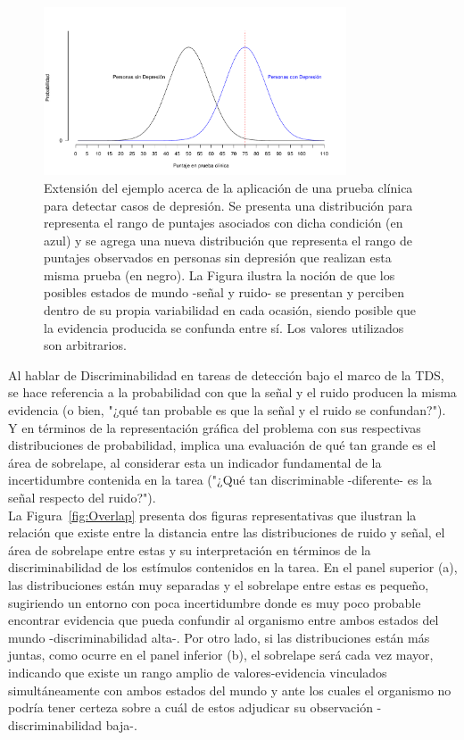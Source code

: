 \begin{figure}[th]
\centering
\includegraphics[width=0.80\textwidth]{Figures/Noise} 
\caption[Variabilidad en la señal y en el ruido]{Extensión del ejemplo acerca de la aplicación de una prueba clínica para detectar casos de depresión. Se presenta una distribución para representa el rango de puntajes asociados con dicha condición (en azul) y se agrega una nueva distribución que representa el rango de puntajes observados en personas sin depresión que realizan esta misma prueba (en negro). La Figura ilustra la noción de que los posibles estados de mundo -señal y ruido- se presentan y perciben dentro de su propia variabilidad en cada ocasión, siendo posible que la evidencia producida se confunda entre sí. Los valores utilizados son arbitrarios.}
\label{fig:Noise}
\end{figure}

Al hablar de Discriminabilidad en tareas de detección bajo el marco de la TDS, se hace referencia a la probabilidad con que la señal y el ruido producen la misma evidencia (o bien, "¿qué tan probable es que la señal y el ruido se confundan?"). Y en términos de la representación gráfica del problema con sus respectivas distribuciones de probabilidad, implica una evaluación de qué tan grande es el área de sobrelape, al considerar esta un indicador fundamental de la incertidumbre contenida en la tarea ("¿Qué tan discriminable -diferente- es la señal respecto del ruido?").\\

La Figura~\ref{fig:Overlap} presenta dos figuras representativas que ilustran la relación que existe entre la distancia entre las distribuciones de ruido y señal, el área de sobrelape entre estas y su interpretación en términos de la discriminabilidad de los estímulos contenidos en la tarea. En el panel superior (a), las distribuciones están muy separadas y el sobrelape entre estas es pequeño, sugiriendo un entorno con poca incertidumbre donde es muy poco probable encontrar evidencia que pueda confundir al organismo entre ambos estados del mundo -discriminabilidad alta-. Por otro lado, si las distribuciones están más juntas, como ocurre en el panel inferior (b), el sobrelape será cada vez mayor, indicando que existe un rango amplio de valores-evidencia vinculados simultáneamente con ambos estados del mundo y ante los cuales el organismo no podría tener certeza sobre a cuál de estos adjudicar su observación -discriminabilidad baja-.\\

